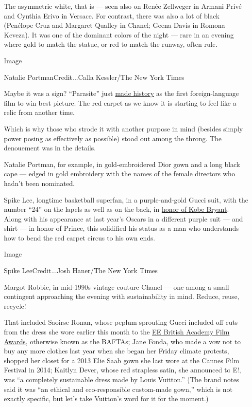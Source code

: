 The asymmetric white, that is --- seen also on Renée Zellweger in Armani
Privé and Cynthia Erivo in Versace. For contrast, there was also a lot
of black (Penélope Cruz and Margaret Qualley in Chanel; Geena Davis in
Romona Keveza). It was one of the dominant colors of the night --- rare
in an evening where gold to match the statue, or red to match the
runway, often rule.

Image

Natalie PortmanCredit...Calla Kessler/The New York Times

Maybe it was a sign? ``Parasite'' just
\href{https://www.nytimes.com/2020/02/09/movies/parasite-movie-oscars-best-picture.html}{made
history} as the first foreign-language film to win best picture. The red
carpet as we know it is starting to feel like a relic from another time.

Which is why those who strode it with another purpose in mind (besides
simply power posing as effectively as possible) stood out among the
throng. The denouement was in the details.

Natalie Portman, for example, in gold-embroidered Dior gown and a long
black cape --- edged in gold embroidery with the names of the female
directors who hadn't been nominated.

Spike Lee, longtime basketball superfan, in a purple-and-gold Gucci
suit, with the number ``24'' on the lapels as well as on the back, in
\href{https://www.nytimes.com/2020/01/28/sports/basketball/kobe-bryant-death.html}{honor
of Kobe Bryant}. Along with his appearance at last year's Oscars in a
different purple suit --- and shirt --- in honor of Prince, this
solidified his status as a man who understands how to bend the red
carpet circus to his own ends.

Image

Spike LeeCredit...Josh Haner/The New York Times

Margot Robbie, in mid-1990s vintage couture Chanel --- one among a small
contingent approaching the evening with sustainability in mind. Reduce,
reuse, recycle!

That included Saoirse Ronan, whose peplum-sprouting Gucci included
off-cuts from the dress she wore earlier this month to the
\href{https://www.nytimes.com/2020/02/02/arts/bafta-winners-2020.html?searchResultPosition=1}{EE
British Academy Film Awards}, otherwise known as the BAFTAs; Jane Fonda,
who made a vow not to buy any more clothes last year when she began her
Friday climate protests, shopped her closet for a 2013 Elie Saab gown
she last wore at the Cannes Film Festival in 2014; Kaitlyn Dever, whose
red strapless satin, she announced to E!, was ``a completely sustainable
dress made by Louis Vuitton.'' (The brand notes said it was ``an ethical
and eco-responsible custom-made gown,'' which is not exactly specific,
but let's take Vuitton's word for it for the moment.)


